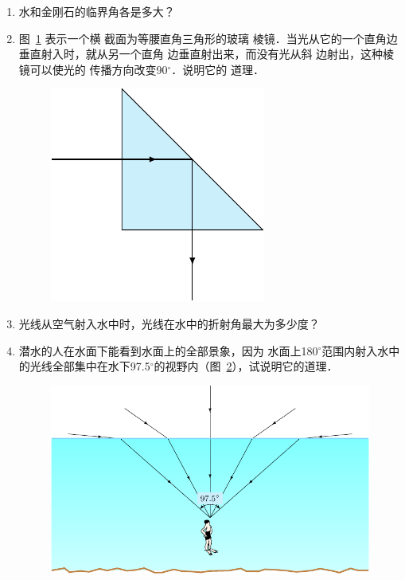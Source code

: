 \begin{enumerate}
    \item 水和金刚石的临界角各是多大？
    \item 图~\ref{fig_C_5-29} 表示一个横
截面为等腰直角三角形的玻璃
棱镜．当光从它的一个直角边垂直射入时，就从另一个直角
边垂直射出来，而没有光从斜
边射出，这种棱镜可以使光的
传播方向改变90$^\circ$．说明它的
道理．
\begin{figure}[htbp]
    \centering
    \includegraphics{fig/C/5-29.pdf}
    \caption{}\label{fig_C_5-29}
\end{figure}

\item 光线从空气射入水中时，光线在水中的折射角最大为多少度？
\item 潜水的人在水面下能看到水面上的全部景象，因为
水面上180$^\circ$范围内射入水中的光线全部集中在水下97.5$^\circ$的视野内（图~\ref{fig_C_5-30}），试说明它的道理．
\begin{figure}[htbp]
    \centering
    \includegraphics{fig/C/5-30.pdf}
    \caption{}\label{fig_C_5-30}
\end{figure}
\end{enumerate}

